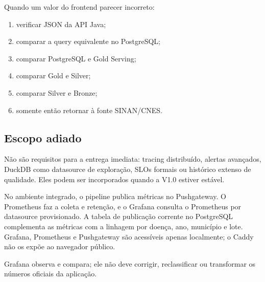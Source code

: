 Quando um valor do frontend parecer incorreto:

\begin{enumerate}
    \item verificar JSON da API Java;
    \item comparar a query equivalente no PostgreSQL;
    \item comparar PostgreSQL e Gold Serving;
    \item comparar Gold e Silver;
    \item comparar Silver e Bronze;
    \item somente então retornar à fonte SINAN/CNES.
\end{enumerate}

\subsection{Escopo adiado}

Não são requisitos para a entrega imediata: tracing distribuído, alertas avançados, DuckDB como datasource de exploração, SLOs formais ou histórico extenso de qualidade. Eles podem ser incorporados quando a V1.0 estiver estável.

No ambiente integrado, o pipeline publica métricas no Pushgateway. O Prometheus
faz a coleta e retenção, e o Grafana consulta o Prometheus por datasource
provisionado. A tabela de publicação corrente no PostgreSQL complementa as
métricas com a linhagem por doença, ano, município e lote. Grafana, Prometheus e
Pushgateway são acessíveis apenas localmente; o Caddy não os expõe ao navegador
público.

\begin{regra}
Grafana observa e compara; ele não deve corrigir, reclassificar ou transformar os números oficiais da aplicação.
\end{regra}
